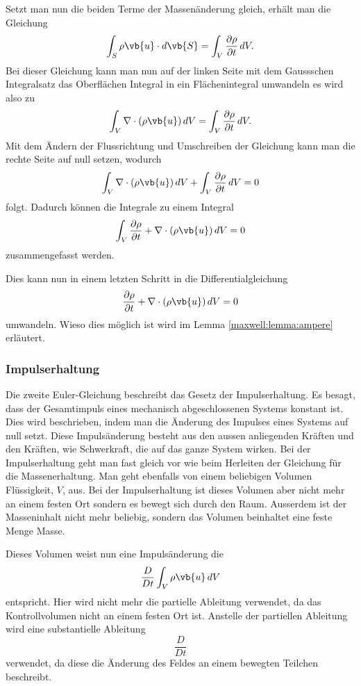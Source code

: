Setzt man nun die beiden Terme der Massenänderung gleich, erhält man die Gleichung 
\[\int_{S}\rho\vb{u}\cdot d\vb{S} 
=
\int_{V} \frac{\partial \rho}{\partial t} \, dV .\] 
Bei dieser Gleichung kann man nun auf der linken Seite mit dem Gaussschen Integralsatz das Oberflächen Integral in ein Flächenintegral umwandeln es wird also zu
\[\int_{V}\nabla\cdot(\rho\vb{u}) \, dV
=
\int_{V}\frac{\partial \rho}{\partial t}  \, dV .\]
Mit dem Ändern der Flussrichtung und Umschreiben der Gleichung kann man die rechte Seite auf null setzen, wodurch 
\[\int_{V}\nabla\cdot(\rho\vb{u})  \, dV + \int_{V}\frac{\partial \rho}{\partial t}  \, dV 
= 
0\] 
folgt.
Dadurch können die Integrale zu einem Integral
\[\int_{V} \frac{\partial \rho}{\partial t} + \nabla\cdot(\rho\vb{u})  \, dV 
= 
0\]
zusammengefasst werden.

Dies kann nun in einem letzten Schritt in die Differentialgleichung
\begin{equation}
\label{openfoam:euler1}
\frac{\partial \rho}{\partial t} + \nabla\cdot(\rho\vb{u})  \, dV 
= 
0
\end{equation}
umwandeln.
Wieso dies möglich ist wird im Lemma \ref{maxwell:lemma:ampere} erläutert.

\subsubsection{Impulserhaltung}
Die zweite Euler-Gleichung beschreibt das Gesetz der Impulserhaltung. 
Es besagt, dass der Gesamtimpuls eines mechanisch abgeschlossenen Systems konstant ist.
Dies wird beschrieben, indem man die Änderung des Impulses eines Systems auf null setzt.
Diese Impulsänderung besteht aus den aussen anliegenden Kräften und den Kräften, wie Schwerkraft, die auf das ganze System wirken.
Bei der Impulserhaltung geht man fast gleich vor wie beim Herleiten der Gleichung für die Massenerhaltung.
Man geht ebenfalls von einem beliebigen Volumen Flüssigkeit, $V$, aus.
Bei der Impulserhaltung ist dieses Volumen aber nicht mehr an einem festen Ort sondern es bewegt sich durch den Raum.
Ausserdem ist der Masseninhalt nicht mehr beliebig, sondern das Volumen beinhaltet eine feste Menge Masse.

Dieses Volumen weist nun eine Impulsänderung die
\[\frac{D}{Dt}\int_{V}\rho\vb{u}\, dV\]
entspricht.
Hier wird nicht mehr die partielle Ableitung verwendet, da das Kontrollvolumen nicht an einem festen Ort ist.
Anstelle der partiellen Ableitung wird eine substantielle Ableitung \[\frac{D}{Dt}\] verwendet, da diese die Änderung des Feldes an einem bewegten Teilchen beschreibt.

